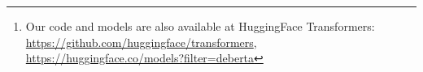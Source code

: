 \begin{abstract}
The significant performance boost makes the single DeBERTa model surpass the human performance on the SuperGLUE benchmark~\citep{wang2019superglue} for the first time in terms of macro-average score (89.9 versus 89.8), and the ensemble DeBERTa model sits atop the SuperGLUE leaderboard as of January 6, 2021, outperforming the human baseline by a decent margin (90.3 versus 89.8). The pre-trained DeBERTa models and the source code were released at: \url{https://github.com/microsoft/DeBERTa}\footnote{Our code and models are also available at HuggingFace Transformers: \url{https://github.com/huggingface/transformers}, \url{https://huggingface.co/models?filter=deberta} }.



\end{abstract}

